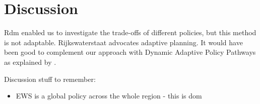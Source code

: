 \section{Discussion}
\label{s:discussion}




Rdm enabled us to investigate the trade-offs of different policies, but this method is not adaptable. Rijkswaterstaat advocates adaptive planning. It would have been good to complement our approach with Dynamic Adaptive Policy Pathways as explained by \cite{kwakkel_coping_2016}.

Discussion stuff to remember:
\begin{itemize}
    \item EWS is a global policy across the whole region - this is dom
\end{itemize}